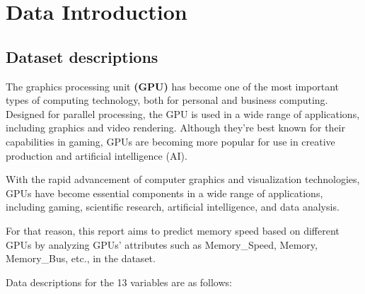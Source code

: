 \section{Data Introduction}
\subsection{Dataset descriptions}

The graphics processing unit \textbf{(GPU)} has become one of the most important types of computing technology, both for personal and business computing. Designed for parallel processing, the GPU is used in a wide range of applications, including graphics and video rendering. Although they’re best known for their capabilities in gaming, GPUs are becoming more popular for use in creative production and artificial intelligence (AI).

With the rapid advancement of computer graphics and visualization technologies, GPUs have become essential components in a wide range of applications, including gaming, scientific research, artificial intelligence, and data analysis.

For that reason, this report aims to predict memory speed based on different GPUs by analyzing GPUs' attributes such as Memory\_Speed, Memory, Memory\_Bus, etc., in the dataset.

Data descriptions for the 13 variables are as follows:      



 


